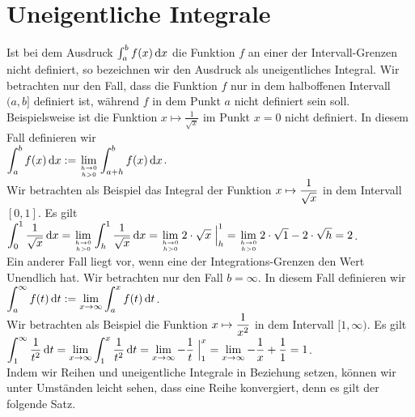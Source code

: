 \section{Uneigentliche Integrale}
Ist bei dem Ausdruck $\int_a^b f(x)\,\textrm{d} x$ die Funktion $f$ an einer der Intervall-Grenzen
nicht definiert, so bezeichnen wir den Ausdruck als uneigentliches Integral.  Wir
betrachten nur den Fall, dass die Funktion $f$ nur in dem halboffenen Intervall $(a, b]$
definiert ist, w\"ahrend $f$  in dem Punkt $a$ nicht definiert sein soll.  Beispielsweise
ist die Funktion $x \mapsto \frac{1}{\sqrt{x}}$ im Punkt $x=0$ nicht definiert.  In diesem
Fall definieren wir 
\\[0.2cm]
\hspace*{1.3cm}
$\displaystyle \int_a^b f(x)\, \textrm{d} x := \lim\limits_{h\rightarrow 0 \atop h > 0} \int_{a+h}^b f(x)\, \textrm{d} x$.
\\[0.2cm]
Wir betrachten als Beispiel das Integral der Funktion $\displaystyle x \mapsto \frac{1}{\sqrt{x}}$ in
dem Intervall $[0,1]$.  Es gilt
\\[0.2cm]
\hspace*{1.3cm}
$\displaystyle \int_0^1 \frac{1}{\sqrt{x}}\, \textrm{d} x 
 = \lim\limits_{h\rightarrow 0 \atop h >  0} \int_{h}^1 \frac{1}{\sqrt{x}}\, \textrm{d} x
 = \lim\limits_{h\rightarrow 0 \atop h >  0} 2\cdot\sqrt{x}\; \Big|_h^1
 = \lim\limits_{h\rightarrow 0 \atop h >  0} 2\cdot\sqrt{1} - 2\cdot\sqrt{h} = 2$.
\\[0.2cm]
Ein anderer Fall liegt vor, wenn eine der Integrations-Grenzen den Wert Unendlich hat.
Wir betrachten nur den Fall $b= \infty$.  In diesem Fall definieren wir
\\[0.2cm]
\hspace*{1.3cm}
$\displaystyle \int_a^\infty f(t)\, \textrm{d} t := \lim\limits_{x\rightarrow \infty} \int_{a}^x f(t)\, \textrm{d} t$.
\\[0.2cm]
Wir betrachten als Beispiel die Funktion $\displaystyle x \mapsto \frac{1}{x^2}$ in dem Intervall
$[1,\infty)$. Es gilt
\\[0.2cm]
\hspace*{1.3cm}
$\displaystyle \int_1^\infty \frac{1}{t^2}\, \textrm{d} t = 
\lim\limits_{x\rightarrow \infty} \int_{1}^x \frac{1}{t^2}\, \textrm{d} t =
\lim\limits_{x\rightarrow \infty} - \frac{1}{t}\;\Big|_1^x =
\lim\limits_{x\rightarrow \infty} - \frac{1}{x} + \frac{1}{1}  = 1
$.
\\[0.2cm]
Indem wir Reihen und uneigentliche Integrale in Beziehung setzen, k\"onnen wir unter
Umst\"anden leicht sehen, dass eine Reihe konvergiert, denn es gilt der folgende Satz.


